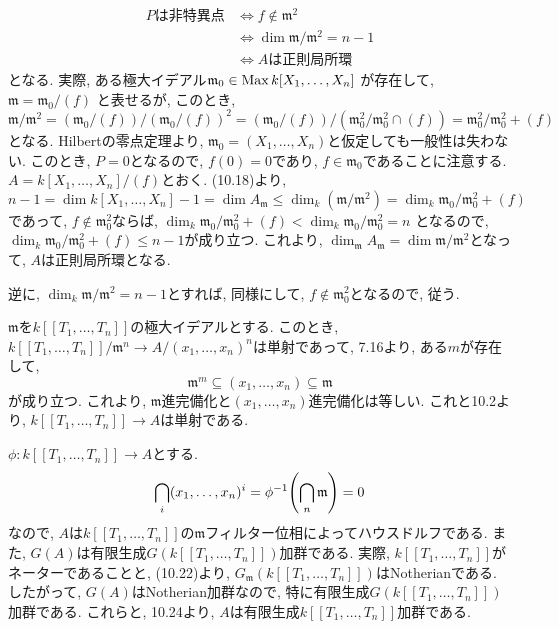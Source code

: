 \documentclass[dvipdfmx]{jsarticle}
\begin{document}
    \begin{problem}
        \begin{align*}
            \mbox{$P$は非特異点}
            &\Longleftrightarrow f \notin \mathfrak{m}^2\\
            &\Longleftrightarrow \dim \mathfrak{m}/\mathfrak{m}^2 = n-1\\
            &\Longleftrightarrow \mbox{$A$は正則局所環}
        \end{align*}
        となる.
        実際, ある極大イデアル$\mathfrak{m}_0 \in \operatorname{Max}{k[X_1, \dots, X_n]}$
        が存在して, $\mathfrak{m} = \mathfrak{m}_0/(f)$
        と表せるが, このとき,
        \[
            \mathfrak{m}/\mathfrak{m}^2 = (\mathfrak{m}_0/(f))/(\mathfrak{m}_0/(f))^2 =
            (\mathfrak{m}_0/(f))/(\mathfrak{m}_0^2/\mathfrak{m}_0^2 \cap (f)) = \mathfrak{m}_0^2/\mathfrak{m}_0^2 + (f)
        \]
        となる.
        Hilbertの零点定理より,
        $\mathfrak{m}_0 = (X_1, \dots, X_n)$と仮定しても一般性は失わない.
        このとき, $P = 0$となるので, $f(0) = 0$であり, $f \in \mathfrak{m}_0$であることに注意する.
        $A = k[X_1, \dots, X_n]/(f)$とおく.
        (10.18)より,
        \[
            n-1 = \dim{k[X_1, \dots, X_n]} - 1  = \dim A_\mathfrak{m} \leq \dim_k(\mathfrak{m}/\mathfrak{m}^2) = \dim_k \mathfrak{m}_0/\mathfrak{m}_0^2 + (f)
        \]
        であって,
        $f \notin \mathfrak{m}_0^2$ならば, $\dim_k \mathfrak{m}_0/\mathfrak{m}_0^2 + (f) < \dim_k \mathfrak{m}_0/\mathfrak{m}_0^2 = n$
        となるので, $\dim_k\mathfrak{m}_0/\mathfrak{m}_0^2 + (f) \leq n-1$が成り立つ.
        これより, $\dim_\mathfrak{m} A_\mathfrak{m} = \dim \mathfrak{m}/\mathfrak{m}^2$となって, $A$は正則局所環となる.

        逆に, $\dim_k \mathfrak{m}/\mathfrak{m}^2 = n-1$とすれば, 同様にして, $f \notin \mathfrak{m}_0^2$となるので, 従う.
    \end{problem}

    \begin{problem}
        $\mathfrak{m}$を$k[\![T_1, \dots, T_n]\!]$の極大イデアルとする.
        このとき, $k[\![T_1, \dots, T_n]\!]/\mathfrak{m}^n \to A/(x_1, \dots, x_n)^n$は単射であって,
        7.16より, ある$m$が存在して,
        \[
            \mathfrak{m}^m \subseteq (x_1, \dots, x_n) \subseteq \mathfrak{m}
        \]
        が成り立つ.
        これより, $\mathfrak{m}$進完備化と$(x_1, \dots, x_n)$進完備化は等しい.
        これと10.2より, $k[\![T_1, \dots, T_n]\!] \to A$は単射である.

        $\phi :k[\![T_1, \dots, T_n]\!] \to A$とする.
        \[
            \bigcap_i (x_1, \dots, x_n)^i = \phi^{-1}\qty(\bigcap_n \mathfrak{m}) = 0
        \]
        なので, $A$は$k[\![T_1, \dots, T_n]\!]$の$\mathfrak{m}$フィルター位相によってハウスドルフである.
        また,
        $G(A)$は有限生成$G(k[\![T_1, \dots, T_n]\!])$加群である.
        実際, $k[\![T_1, \dots, T_n]\!]$がネーターであることと, (10.22)より,
        $G_\mathfrak{m}(k[\![T_1, \dots, T_n]\!])$はNotherianである.
        したがって, $G(A)$はNotherian加群なので, 特に有限生成$G(k[\![T_1, \dots, T_n]\!])$加群である.
        これらと, 10.24より, $A$は有限生成$k[\![T_1, \dots, T_n]\!]$加群である.
    \end{problem}
\end{document}
